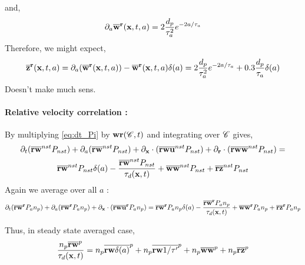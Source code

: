 and, 
\begin{equation*}
    \partial_a\overline{\textbf{w}}^{\textbf{r}}(\textbf{x},t,a)
    =  2\frac{d_p}{\tau_a^2} e^{- 2 a/\tau_a}
\end{equation*}
Therefore, we might expect, 
\begin{equation}
    \overline{\textbf{z}}^{\textbf{r}}(\textbf{x},t,a)
    = \partial_a (\overline{\textbf{w}}^{\textbf{r}}(\textbf{x},t,a))
    - \overline{\textbf{w}}^{\textbf{r}}(\textbf{x},t,a)\delta(a)
    =  2\frac{d_p}{\tau_a^2} e^{- 2 a/\tau_a}
    + 0.3 \frac{d_p}{\tau_a}\delta(a)
\end{equation}
Doesn't make much sens. 

\paragraph{Relative velocity correlation :}
By multiplying \ref{eq:dt_Pi} by $\textbf{wr} (\mathscr{C},t)$ and integrating over $\mathscr{C}$ gives,
\begin{multline}
    \partial_t (\overline{\textbf{rw}}^{nst} P_{nst})
    + \partial_a (\overline{\textbf{rw}}^{nst} P_{nst})
    + \partial_{\textbf{x}} \cdot (\overline{\textbf{rw}\textbf{u} }^{nst} P_{nst})
    + \partial_{\textbf{r}}  \cdot (\overline{\textbf{rw}\textbf{w}}^{nst} P_{nst})
    =  \\
    \overline{\textbf{rw}}^{nst} P_{nst}\delta(a)
    -  \frac{\overline{\textbf{rw}}^{nst} P_{nst}}{\tau_d(\textbf{x},t)}
    + \overline{\textbf{ww}}^{nst}P_{nst}
    + \overline{\textbf{rz}}^{nst}P_{nst}
\end{multline}
Again we average over all $a$ : 
\begin{multline}
    \partial_t (\overline{\textbf{rw}}^{\textbf{r}} P_{a}n_p)
    + \partial_a (\overline{\textbf{rw}}^{\textbf{r}} P_{a}n_p)
    + \partial_{\textbf{x}} \cdot (\overline{\textbf{rw}\textbf{u} }^{\textbf{r}} P_{a}n_p)
    =  
    \overline{\textbf{rw}}^{\textbf{r}} P_{a}n_p\delta(a)
    -  \frac{\overline{\textbf{rw}}^{\textbf{r}} P_{a}n_p}{\tau_d(\textbf{x},t)}
    + \overline{\textbf{ww}}^{\textbf{r}}P_{a}n_p
    + \overline{\textbf{rz}}^{\textbf{r}}P_{a}n_p
\end{multline}

Thus, in steady state averaged case, 
\begin{equation}
      \frac{n_p\overline{\textbf{rw}}^{p}}{\tau_d(\textbf{x},t)}
    =  
    n_p\overline{\textbf{rw} \delta(a)}^{p}
    + n_p\overline{\textbf{rw} 1/\tau'}^{p}
    + n_p\overline{\textbf{ww}}^{p}
    + n_p\overline{\textbf{rz}}^{p}
\end{equation}


